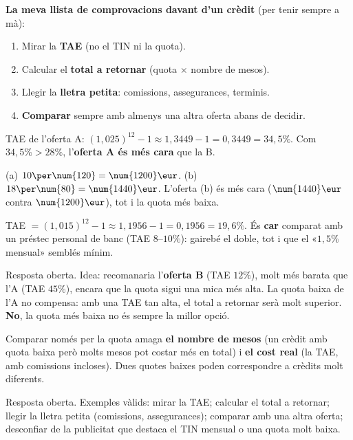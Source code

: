 \begin{idea}
\textbf{La meva llista de comprovacions davant d'un crèdit} (per tenir sempre a mà):
\begin{enumerate}[leftmargin=1.6em, itemsep=1pt]
  \item Mirar la \textbf{TAE} (no el TIN ni la quota).
  \item Calcular el \textbf{total a retornar} (quota $\times$ nombre de mesos).
  \item Llegir la \textbf{lletra petita}: comissions, assegurances, terminis.
  \item \textbf{Comparar} sempre amb almenys una altra oferta abans de decidir.
\end{enumerate}
\end{idea}

\begin{solucions}
\begin{sollist}
  \item TAE de l'oferta A: $(1,025)^{12}-1\approx 1,3449-1=0,3449=34,5\%$. Com
        $34,5\%>28\%$, l'\textbf{oferta A és més cara} que la B.
  \item (a) $10\per\num{120}=\num{1200}\eur$. \quad (b) $18\per\num{80}=\num{1440}\eur$.
        L'oferta (b) és més cara ($\num{1440}\eur$ contra $\num{1200}\eur$), tot i la
        quota més baixa.
  \item TAE $=(1,015)^{12}-1\approx 1,1956-1=0,1956=19,6\%$. És \textbf{car} comparat
        amb un préstec personal de banc (TAE $8$–$10\%$): gairebé el doble, tot i que el
        «$1,5\%$ mensual» semblés mínim.
  \item Resposta oberta. Idea: recomanaria l'\textbf{oferta B} (TAE $12\%$), molt més
        barata que l'A (TAE $45\%$), encara que la quota sigui una mica més alta. La
        quota baixa de l'A no compensa: amb una TAE tan alta, el total a retornar serà
        molt superior. \textbf{No}, la quota més baixa no és sempre la millor opció.
  \item Comparar només per la quota amaga \textbf{el nombre de mesos} (un crèdit amb
        quota baixa però molts mesos pot costar més en total) i \textbf{el cost real}
        (la TAE, amb comissions incloses). Dues quotes baixes poden correspondre a
        crèdits molt diferents.
  \item Resposta oberta. Exemples vàlids: mirar la TAE; calcular el total a retornar;
        llegir la lletra petita (comissions, assegurances); comparar amb una altra
        oferta; desconfiar de la publicitat que destaca el TIN mensual o una quota molt
        baixa.
\end{sollist}
\end{solucions}
